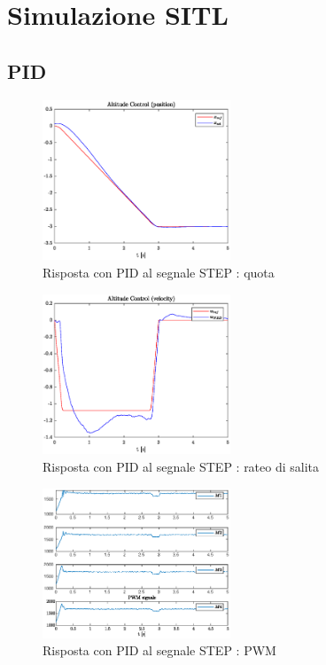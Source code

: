 \section{Simulazione SITL}
\subsection{PID}

\begin{figure}
	\centering
	\includegraphics[width=0.5\textwidth]{Simulazioni/Figure/STEPaltitudecontrolposPID}
	\caption{Risposta con PID al segnale STEP : quota}
\end{figure}

\begin{figure}
	\centering
	\includegraphics[width=0.5\textwidth]{Simulazioni/Figure/STEPaltitudecontrolvelPID}
	\caption{Risposta con PID al segnale STEP : rateo di salita}
\end{figure}

\begin{figure}
	\centering
	\includegraphics[width=0.5\textwidth]{Simulazioni/Figure/STEPpwmPID}
	\caption{Risposta con PID al segnale STEP : PWM}
\end{figure}

